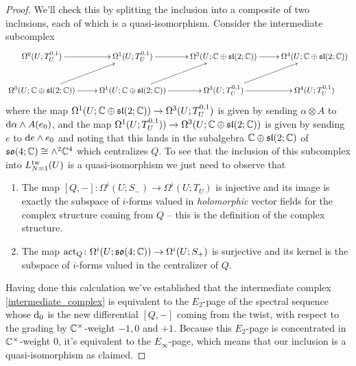 \documentclass[10pt, oneside]{article}
\def\d{{\rm d}}
\begin{document}
\begin{proof}
We'll check this by splitting the inclusion into a composite of two inclusions, each of which is a quasi-isomorphism.  Consider the intermediate subcomplex
\begin{equation}\xymatrix{
 \Omega^0(U; T^{0,1}_U) \ar[r] & \Omega^1(U; T^{0,1}_U) \ar[r] &\Omega^3(U; \CC \oplus \sl(2;\CC)) \ar[r] &\Omega^4(U; \CC \oplus \sl(2;\CC)) \\
   \Omega^0(U; \CC \oplus \sl(2;\CC)) \ar[r] \ar[ur] & \Omega^1(U; \CC \oplus \sl(2;\CC)) \ar[r] \ar[ur] &\Omega^3(U; T^{0,1}_U) \ar[r] \ar[ur] &\Omega^4(U; T^{0,1}_U) 
} \label{intermediate_complex}\end{equation}
where the map $\Omega^1(U; \mathbb{C} \oplus \mathfrak{sl}(2;\mathbb{C})) \to \Omega^3(U; T^{0,1}_U)$ is given by sending $\alpha \otimes A$ to $\d \alpha \wedge A(e_0)$, and the map $\Omega^1(U; T^{0,1}_U)) \to \Omega^3(U; \mathbb{C} \oplus \mathfrak{sl}(2;\mathbb{C}))$ is given by sending $e$ to $\d e \wedge e_0$ and noting that this lands in the subalgebra $\mathbb{C} \oplus \mathfrak{sl}(2;\mathbb{C})$ of $\mathfrak{so}(4;\mathbb{C}) \cong \wedge^2 \mathbb{C}^4$ which centralizes $Q$.  To see that the inclusion of this subcomplex into $L_{N=1}^{\mathrm{tw}}(U)$ is a quasi-isomorphism we just need to observe that 
\begin{enumerate}
 \item The map $[Q,-] \colon \Omega^i(U; S_-) \to \Omega^i(U; T_U)$ is injective and its image is exactly the subspace of $i$-forms valued in \emph{holomorphic} vector fields for the complex structure coming from $Q$ -- this is the definition of the complex structure.
 \item The map $\mathrm{act}_Q \colon \Omega^i(U; \mathfrak{so}(4;\mathbb{C})) \to \Omega^i(U; S_+)$ is surjective and its kernel is the subspace of $i$-forms valued in the centralizer of $Q$.
\end{enumerate}
Having done this calculation we've established that the intermediate complex \ref{intermediate_complex} is equivalent to the $E_2$-page of the spectral sequence whose $\d_0$ is the new differential $[Q,-]$ coming from the twist, with respect to the grading by $\mathbb{C}^\times$-weight $-1,0$ and $+1$.  Because this $E_2$-page is concentrated in $\mathbb{C}^\times$-weight 0, it's equivalent to the $E_\infty$-page, which means that our inclusion is a quasi-isomorphism as claimed.


\end{proof}
\end{document}
